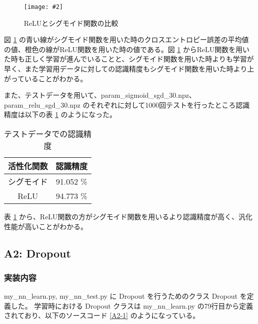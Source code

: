 \documentclass[a4paper,dvipdfmx]{jsarticle}
\newcommand{\image}[3]{
    \begin{figure}[H]
        \begin{center}
        \texttt{[image: \#2]}
        \end{center}
        \caption{#1}
        \label{#3}
    \end{figure}
}
\begin{document}
\image{ReLUとシグモイド関数の比較}{report_a1-1.png}{fig-A-1-1}

図 \ref{fig-A-1-1} の青い線がシグモイド関数を用いた時のクロスエントロピー誤差の平均値の値、橙色の線がReLU関数を用いた時の値である。図 \ref{fig-A-1-1} からReLU関数を用いた時も正しく学習が進んでいることと、シグモイド関数を用いた時よりも学習が早く、また学習用データに対しての認識精度もシグモイド関数を用いた時より上がっていることがわかる。

また、テストデータを用いて、param\_sigmoid\_sgd\_30.npz、param\_relu\_sgd\_30.npz のそれぞれに対して1000回テストを行ったところ認識精度は以下の表 \ref{table-A1-1} のようになった。

\begin{table}[H]
\begin{center}
\caption{テストデータでの認識精度}
  \begin{tabular}{|c|c|} \hline
    活性化関数 & 認識精度  \\ \hline \hline
    シグモイド & 91.052 \%  \\ \hline
    ReLU & 94.773 \% \\ \hline
  \end{tabular}
	\label{table-A1-1}
\end{center}
\end{table}

表 \ref{table-A1-1} から、ReLU関数の方がシグモイド関数を用いるより認識精度が高く、汎化性能が高いことがわかる。

\subsection*{A2: Dropout}

\subsubsection*{実装内容}

my\_nn\_learn.py, my\_nn\_test.py に Dropout を行うためのクラス Dropout を定義した。
学習時における Dropout クラスは my\_nn\_learn.py の79行目から定義されており、以下のソースコード \ref{A2-1} のようになっている。
\end{document}
